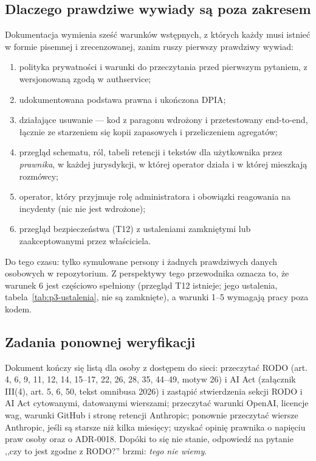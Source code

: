 \subsection{Dlaczego prawdziwe wywiady są poza zakresem}

Dokumentacja wymienia sześć warunków wstępnych, z których każdy musi istnieć w formie
pisemnej i zrecenzowanej, zanim ruszy pierwszy prawdziwy wywiad:

\begin{enumerate}[leftmargin=*]
    \item polityka prywatności i warunki do przeczytania przed pierwszym pytaniem, z
    wersjonowaną zgodą w authservice;
    \item udokumentowana podstawa prawna i ukończona DPIA;
    \item działające usuwanie --- kod z paragonu wdrożony i przetestowany end-to-end, łącznie
    ze starzeniem się kopii zapasowych i przeliczeniem agregatów;
    \item przegląd schematu, ról, tabeli retencji i tekstów dla użytkownika przez
    \emph{prawnika}, w każdej jurysdykcji, w której operator działa i w której mieszkają
    rozmówcy;
    \item operator, który przyjmuje rolę administratora i obowiązki reagowania na
    incydenty (nic nie jest wdrożone);
    \item przegląd bezpieczeństwa (T12) z ustaleniami zamkniętymi lub zaakceptowanymi
    przez właściciela.
\end{enumerate}

Do tego czasu: tylko symulowane persony i żadnych prawdziwych danych osobowych w
repozytorium. Z perspektywy tego przewodnika oznacza to, że warunek 6 jest częściowo
spełniony (przegląd T12 istnieje; jego ustalenia, tabela~\ref{tab:p3-ustalenia}, nie są
zamknięte), a warunki 1--5 wymagają pracy poza kodem.

\subsection{Zadania ponownej weryfikacji}

Dokument kończy się listą dla osoby z dostępem do sieci: przeczytać RODO (art. 4, 6, 9,
11, 12, 14, 15--17, 22, 26, 28, 35, 44--49, motyw 26) i AI Act (załącznik III(4),
art. 5, 6, 50, tekst omnibusa 2026) i zastąpić stwierdzenia sekcji RODO i AI Act
cytowanymi, datowanymi wierszami; przeczytać warunki OpenAI, licencje wag, warunki
GitHub i stronę retencji Anthropic; ponownie przeczytać wiersze Anthropic, jeśli są
starsze niż kilka miesięcy; uzyskać opinię prawnika o napięciu praw osoby oraz o
ADR-0018. Dopóki to się nie stanie, odpowiedź na pytanie ,,czy to jest zgodne z
RODO?'' brzmi: \emph{tego nie wiemy}.
